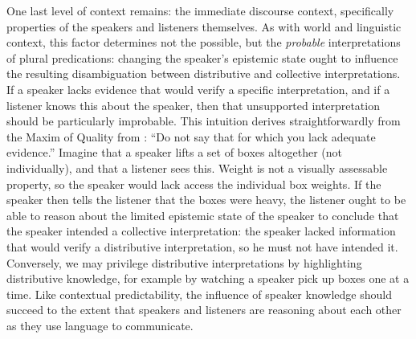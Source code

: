 \documentclass[linguex]{sp}
\begin{document}
One last level of context remains: the immediate discourse context, specifically properties of the speakers and listeners themselves. As with world and linguistic context, this factor determines not the possible, but the \emph{probable} interpretations of plural predications: changing the speaker's epistemic state ought to influence the resulting disambiguation between distributive and collective interpretations. 
If a speaker lacks evidence that would verify a specific interpretation, and if a listener knows this about the speaker, then that unsupported interpretation should be particularly improbable. This intuition derives straightforwardly from the Maxim of Quality from \cite{grice1975}: ``Do not say that for which you lack adequate evidence.'' Imagine that a speaker lifts a set of boxes altogether (not individually), and that a listener sees this. Weight is not a visually assessable property, so the speaker would lack access the individual box weights. If the speaker then tells the listener that the boxes were heavy, the listener ought to be able to reason about the limited epistemic state of the speaker to conclude that the speaker intended a collective interpretation: the speaker lacked information that would verify a distributive interpretation, so he must not have intended it.  
Conversely, we may privilege distributive interpretations by highlighting distributive knowledge, for example by watching a speaker pick up boxes one at a time. Like contextual predictability, the influence of speaker knowledge should succeed to the extent that speakers and listeners are reasoning about each other as they use language to communicate. 
\end{document}
